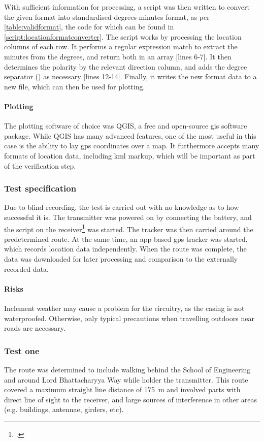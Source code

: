 With sufficient information for processing, a script was then written to convert the given format into standardised
degrees-minutes format, as per \cref{table:validformat}, the code for which can be found in \cref{script:locationformatconverter}.
The script works by processing the location columns of each
row. It performs a regular expression match to extract the minutes from the degrees, and return both in an array [lines 6-7].
It then determines the polarity by the relevant direction column, and adds the degree separator (\textquotesingle) as necessary [lines 12-14].
Finally, it writes the new format data to a new file, which can then be used for plotting.


\paragraph{Plotting}
The plotting software of choice was QGIS, a free and open-source \acrshort{gis} software package.
While QGIS has many advanced features, one of the most useful in this case is the ability to lay \acrshort{gps}
coordinates over a map. It furthermore accepts many formats of location data, including \gls{kml} markup,
which will be important as part of the verification step.

\subsubsection{Test specification}
Due to blind recording, the test is carried out with no knowledge as to how successful it is.
The transmitter was powered on by connecting the battery, and the script on the receiver\footnote{
    .
} was started. The tracker was then carried around the predetermined route. At the same time,
an app based \acrshort{gps} tracker was started, which records location data independently.
When the route was complete, the data was downloaded for later processing and comparison
to the externally recorded data.

\paragraph{Risks}
Inclement weather may cause a problem for the circuitry, as the casing is not 
waterproofed. 
Otherwise, only typical precautions when travelling outdoors near roads are 
necessary. 

\subsubsection{Test one}
The route was determined to include walking behind the School of Engineering and around
Lord Bhattacharyya Way while holder the transmitter.
This route covered a maximum straight line distance of \qty{175}{\m}
and involved parts with direct line of sight to the receiver, and large sources of interference
in other areas (e.g. buildings, antennae, girders, etc).

